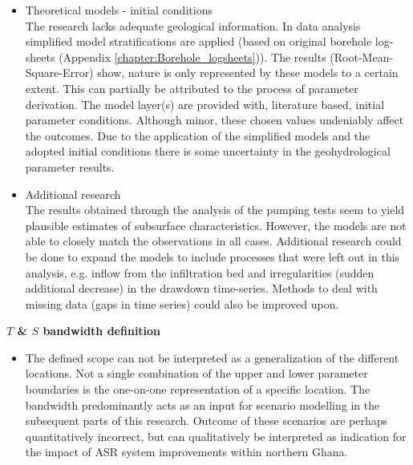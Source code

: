 \begin{itemize}
\item{Theoretical models - initial conditions} \\
The research lacks adequate geological information. In data analysis simplified model stratifications are applied (based on original borehole log-sheets (Appendix \ref{chapter:Borehole_logsheets})). The results (Root-Mean-Square-Error) show, nature is only represented by these models to a certain extent. This can partially be attributed to the process of parameter derivation. The model layer(s) are provided with, literature based, initial parameter conditions. Although minor, these chosen values undeniably affect the outcomes. Due to the application of the simplified models and the adopted initial conditions there is some uncertainty in the geohydrological parameter results. 
\item{Additional research} \\
The results obtained through the analysis of the pumping tests seem to yield plausible estimates of subsurface characteristics. However, the models are not able to closely match the observations in all cases. Additional research could be done to expand the models to include processes that were left out in this analysis, e.g. inflow from the infiltration bed and irregularities (sudden additional decrease) in the drawdown time-series. Methods to deal with missing data (gaps in time series) could also be improved upon.\\
\end{itemize}  
\textbf{$T$ \& $S$ bandwidth definition}
\begin{itemize}
\item{} The defined scope can not be interpreted as a generalization of the different locations. Not a single combination of the upper and lower parameter boundaries is the one-on-one representation of a specific location. The bandwidth predominantly acts as an input for scenario modelling in the subsequent parts of this research. Outcome of these scenarios are perhaps quantitatively incorrect, but can qualitatively be interpreted as indication for the impact of ASR system improvements within northern Ghana. \\
\end{itemize}

